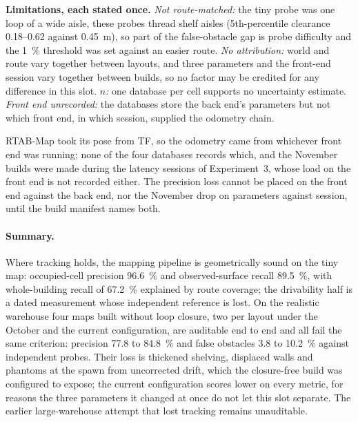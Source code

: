 \documentclass[11pt,a4paper,notitlepage]{report}
\begin{document}
\textbf{Limitations, each stated once.} \emph{Not route-matched:} the tiny
probe was one loop of a wide aisle, these probes thread shelf aisles
(5th-percentile clearance 0.18--0.62 against \SI{0.45}{\metre}), so part of the
false-obstacle gap is probe difficulty and the \SI{1}{\percent} threshold was
set against an easier route. \emph{No attribution:} world and route vary
together between layouts, and three parameters and the front-end session vary
together between builds, so no factor may be credited for any difference in
this slot. \emph{$n$:} one database per cell supports no uncertainty estimate.
\emph{Front end unrecorded:} the databases store the back end's parameters but
not which front end, in which session, supplied the odometry chain.

\begin{queried}
RTAB-Map took its pose from TF, so the odometry came from whichever front end
was running; none of the four databases records which, and the November builds
were made during the latency sessions of Experiment~3, whose load on the front
end is not recorded either. The precision loss cannot be placed on the front
end against the back end, nor the November drop on parameters against session,
until the build manifest names both.
\end{queried}

\paragraph{Summary.} Where tracking holds, the mapping pipeline is
geometrically sound on the tiny map: occupied-cell precision \SI{96.6}{\percent}
and observed-surface recall \SI{89.5}{\percent}, with whole-building recall of
\SI{67.2}{\percent} explained by route coverage; the drivability half is a dated
measurement whose independent reference is lost. On the realistic warehouse
four maps built without loop closure, two per layout under the October and the
current configuration, are auditable end to end and all fail the same
criterion: precision 77.8 to \SI{84.8}{\percent} and false obstacles 3.8 to
\SI{10.2}{\percent} against independent probes. Their loss is thickened
shelving, displaced walls and phantoms at the spawn from uncorrected drift,
which the closure-free build was configured to expose; the current
configuration scores lower on every metric, for reasons the three parameters
it changed at once do not let this slot separate. The earlier large-warehouse
attempt that lost tracking remains unauditable.
\end{document}
